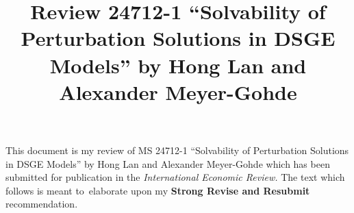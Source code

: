 \documentclass{article}
\title{Review 24712-1 ``Solvability of Perturbation Solutions in DSGE Models'' by Hong Lan and Alexander Meyer-Gohde}
\begin{document}
\maketitle


\makeatletter
\def\fullpath{\begingroup\everyeof{\noexpand}\@sanitize
  \edef\x{\@@input|"find `pwd` -name \jobname.tex" }%
  \edef\x{\endgroup\noexpand\zap@space\x\noexpand\@empty}\x}
\makeatother




This document is my review of
MS 24712-1 ``Solvability of Perturbation Solutions in DSGE Models'' by Hong Lan and Alexander Meyer-Gohde which has been submitted for publication in 
the {\em International Economic Review.}
The text which follows is meant to\ elaborate upon my {\bf Strong Revise and Resubmit} recommendation.
\end{document}

